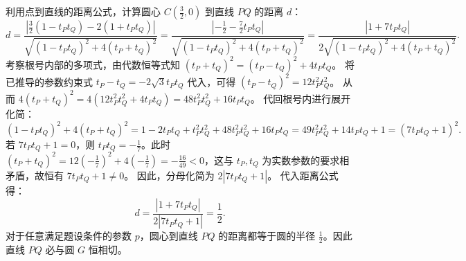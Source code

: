 \begin{solution}
\[\]
利用点到直线的距离公式，计算圆心 $C\left(\frac{3}{2}, 0\right)$ 到直线 $PQ$ 的距离 $d$：
\[
d = \frac{\left| \frac{3}{2}(1 - t_P t_Q) - 2(1 + t_P t_Q) \right|}{\sqrt{(1 - t_P t_Q)^2 + 4(t_P + t_Q)^2}} = \frac{\left| -\frac{1}{2} - \frac{7}{2}t_P t_Q \right|}{\sqrt{(1 - t_P t_Q)^2 + 4(t_P + t_Q)^2}} = \frac{|1 + 7t_P t_Q|}{2\sqrt{(1 - t_P t_Q)^2 + 4(t_P + t_Q)^2}}.
\]
考察根号内部的多项式，由代数恒等式知 $(t_P + t_Q)^2 = (t_P - t_Q)^2 + 4t_P t_Q$。
将已推导的参数约束式 $t_P - t_Q = -2\sqrt{3} t_P t_Q$ 代入，可得 $(t_P - t_Q)^2 = 12 t_P^2 t_Q^2$。
从而 $4(t_P + t_Q)^2 = 4(12 t_P^2 t_Q^2 + 4t_P t_Q) = 48 t_P^2 t_Q^2 + 16 t_P t_Q$。
代回根号内进行展开化简：
\[
(1 - t_P t_Q)^2 + 4(t_P + t_Q)^2 = 1 - 2t_P t_Q + t_P^2 t_Q^2 + 48 t_P^2 t_Q^2 + 16 t_P t_Q = 49 t_P^2 t_Q^2 + 14 t_P t_Q + 1 = (7t_P t_Q + 1)^2.
\]
若 $7t_P t_Q + 1 = 0$，则 $t_P t_Q = -\frac{1}{7}$。此时 $(t_P + t_Q)^2 = 12\left(-\frac{1}{7}\right)^2 + 4\left(-\frac{1}{7}\right) = -\frac{16}{49} < 0$，这与 $t_P, t_Q$ 为实数参数的要求相矛盾，故恒有 $7t_P t_Q + 1 \neq 0$。
因此，分母化简为 $2|7t_P t_Q + 1|$。
代入距离公式得：
\[
d = \frac{|1 + 7t_P t_Q|}{2|7t_P t_Q + 1|} = \frac{1}{2}.
\]
对于任意满足题设条件的参数 $p$，圆心到直线 $PQ$ 的距离都等于圆的半径 $\frac{1}{2}$。因此直线 $PQ$ 必与圆 $G$ 恒相切。
\end{solution}



